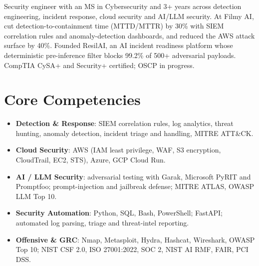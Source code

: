 \documentclass[11pt,a4paper,sans]{moderncv}
\begin{document}
\makecvtitle


\vspace{6pt}
\small{Security engineer with an MS in Cybersecurity and 3+ years across detection engineering, incident response, cloud security and AI/LLM security. At Filmy AI, cut detection-to-containment time (MTTD/MTTR) by 30\% with SIEM correlation rules and anomaly-detection dashboards, and reduced the AWS attack surface by 40\%. Founded ResilAI, an AI incident readiness platform whose deterministic pre-inference filter blocks 99.2\% of 500+ adversarial payloads. CompTIA CySA+ and Security+ certified; OSCP in progress.}


\section{Core Competencies}
\vspace{1pt}
\begin{itemize}

\item \textbf{Detection \& Response}: SIEM correlation rules, log analytics, threat hunting, anomaly detection, incident triage and handling, MITRE ATT\&CK.

\item \textbf{Cloud Security}: AWS (IAM least privilege, WAF, S3 encryption, CloudTrail, EC2, STS), Azure, GCP Cloud Run.

\item \textbf{AI / LLM Security}: adversarial testing with Garak, Microsoft PyRIT and Promptfoo; prompt-injection and jailbreak defense; MITRE ATLAS, OWASP LLM Top 10.

\item \textbf{Security Automation}: Python, SQL, Bash, PowerShell; FastAPI; automated log parsing, triage and threat-intel reporting.

\item \textbf{Offensive \& GRC}: Nmap, Metasploit, Hydra, Hashcat, Wireshark, OWASP Top 10; NIST CSF 2.0, ISO 27001:2022, SOC 2, NIST AI RMF, FAIR, PCI DSS.

\end{itemize}
\end{document}
